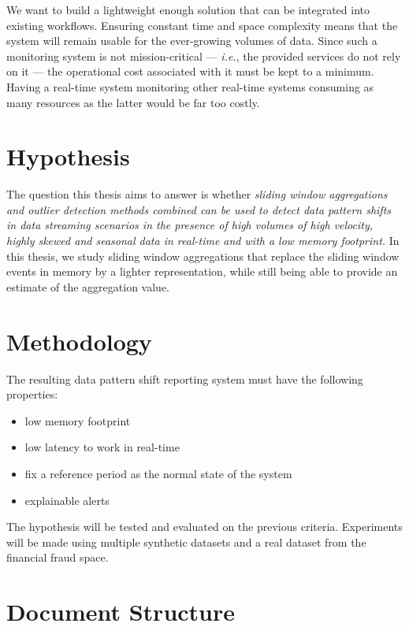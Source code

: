 We want to build a lightweight enough solution that can be integrated into existing workflows. Ensuring constant time and space complexity means that the system will remain usable for the ever-growing volumes of data. Since such a monitoring system is not mission-critical --- \textit{i.e.}, the provided services do not rely on it --- the operational cost associated with it must be kept to a minimum. Having a real-time system monitoring other real-time systems consuming as many resources as the latter would be far too costly.

\section{Hypothesis} \label{sec:hypothesis}
The question this thesis aims to answer is whether \textit{sliding window aggregations and outlier detection methods combined can be used to detect data pattern shifts in data streaming scenarios in the presence of high volumes of high velocity, highly skewed and seasonal data in real-time and with a low memory footprint.} In this thesis, we study sliding window aggregations that replace the sliding window events in memory by a lighter representation, while still being able to provide an estimate of the aggregation value.

\section{Methodology} \label{sec:methodology}

The resulting data pattern shift reporting system must have the following properties:
\begin{itemize}
    \item low memory footprint
    
    \item low latency to work in real-time
    
    \item fix a reference period as the normal state of the system
    
    \item explainable alerts
\end{itemize}
The hypothesis will be tested and evaluated on the previous criteria. Experiments will be made using multiple synthetic datasets and a real dataset from the financial fraud space.

\section{Document Structure} 

